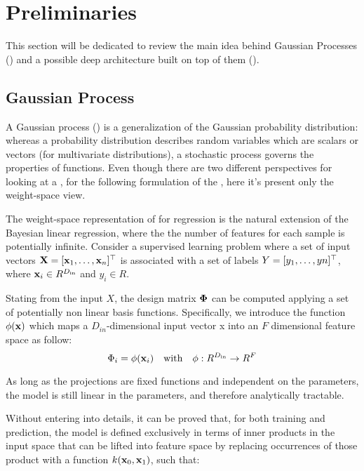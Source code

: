 
\section{Preliminaries}

This section will be dedicated to review the main idea behind Gaussian Processes (\gp) and a possible deep architecture built on top of them (\dgp).

\subsection{Gaussian Process}

A Gaussian process (\gp) is a generalization of the Gaussian probability distribution: whereas a probability distribution describes random variables which are scalars or vectors (for multivariate distributions), a stochastic process governs the properties of functions. Even though there are two different perspectives for looking at a \gp, for the following formulation of the \dgp, here it's present only the weight-space view.

The weight-space representation of \gp for regression is the natural extension of the Bayesian linear regression, where the the number of features for each sample is potentially infinite. Consider a supervised learning problem where a set of input vectors $\mathbf{X} = [\mathbf{x}_1, \ldots, \mathbf{x}_n]^{\top}$ is associated with a set of labels $Y = [y_1, \ldots, yn]^{\top}$, where $\mathbf{x}_i \in R^{D_{\mathrm{in}}}$ and $y_i \in R$.

Stating from the input $X$, the design matrix $\boldsymbol{\Phi}$ can be computed applying a set of potentially non linear basis functions. Specifically, we introduce the function $\phi(\mathbf{x})$ which maps a $D_{in}$-dimensional input vector x into an $F$  dimensional feature space as follow:
\begin{equation}
    \Phi_i = \phi(\mathbf{x}_i) \quad \mbox{with} \quad \phi:R^{D_{\mathrm{in}}}    \rightarrow R^F
\end{equation}

As long as the projections are fixed functions and independent on the parameters, the model is still linear in the parameters, and therefore analytically tractable.

Without entering into details, it can be proved that, for both training and prediction, the model is defined exclusively in terms of inner products in the input space that can be lifted into feature space by replacing occurrences of those product with a function $k(\mathbf{x}_0, \mathbf{x}_1)$, such that:

